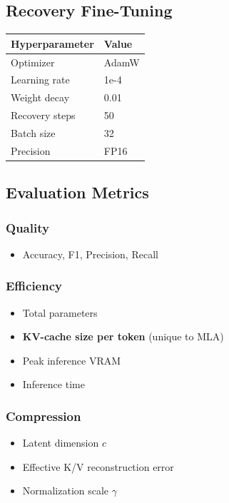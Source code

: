 \subsection{Recovery Fine-Tuning}

\begin{table}[H]
\centering
\small
\begin{tabular}{ll}
\toprule
\textbf{Hyperparameter} & \textbf{Value} \\
\midrule
Optimizer & AdamW \\
Learning rate & 1e-4 \\
Weight decay & 0.01 \\
Recovery steps & 50 \\
Batch size & 32 \\
Precision & FP16 \\
\bottomrule
\end{tabular}
\end{table}

\subsection{Evaluation Metrics}

\subsubsection{Quality}
\begin{itemize}
\item Accuracy, F1, Precision, Recall

\end{itemize}
\subsubsection{Efficiency}
\begin{itemize}
\item Total parameters
\item \textbf{KV-cache size per token} (unique to MLA)
\item Peak inference VRAM
\item Inference time

\end{itemize}
\subsubsection{Compression}
\begin{itemize}
\item Latent dimension $c$
\item Effective K/V reconstruction error
\item Normalization scale $\gamma$

\end{itemize}
